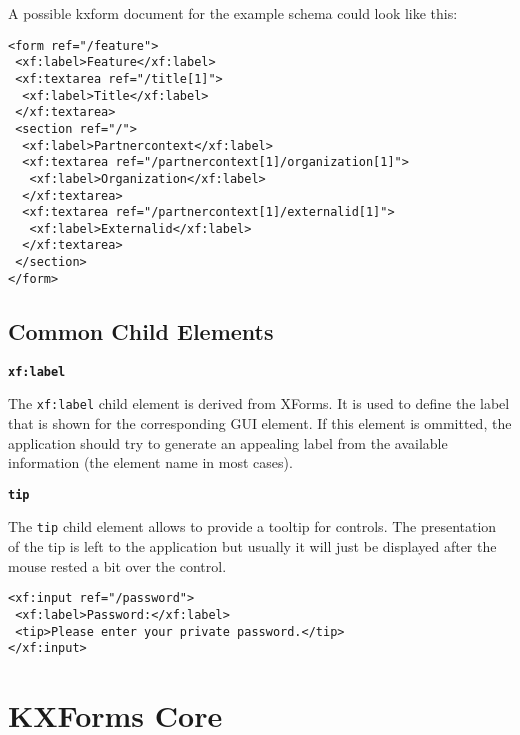 \begin{description}
A possible kxform document for the example schema could look like this:


\begin{lstlisting}[caption=Example KXForms Document]
<form ref="/feature">
 <xf:label>Feature</xf:label>
 <xf:textarea ref="/title[1]">
  <xf:label>Title</xf:label>
 </xf:textarea>
 <section ref="/">
  <xf:label>Partnercontext</xf:label>
  <xf:textarea ref="/partnercontext[1]/organization[1]">
   <xf:label>Organization</xf:label>
  </xf:textarea>
  <xf:textarea ref="/partnercontext[1]/externalid[1]">
   <xf:label>Externalid</xf:label>
  </xf:textarea>
 </section>
</form>
\end{lstlisting}

\end{description}



\subsection{ Common Child Elements}
\label{commonchildelements}
\begin{description}
 \item \textbf{\texttt{xf:label}} 

The \texttt{xf:label} child element is derived from XForms. It is used to define the label that is shown for the corresponding GUI element. If this element is ommitted, the application should try to generate an appealing label from the available information (the element name in most cases).


 \item \textbf{\texttt{tip}} 

The \texttt{tip} child element allows to provide a tooltip for controls. The presentation of the tip is left to the application but usually it will just be displayed after the mouse rested a bit over the control.

\begin{lstlisting}[caption=Example KXForms Document]
<xf:input ref="/password">
 <xf:label>Password:</xf:label>
 <tip>Please enter your private password.</tip>
</xf:input>
\end{lstlisting}
\end{description}









\pagebreak 
\section{ KXForms Core}

